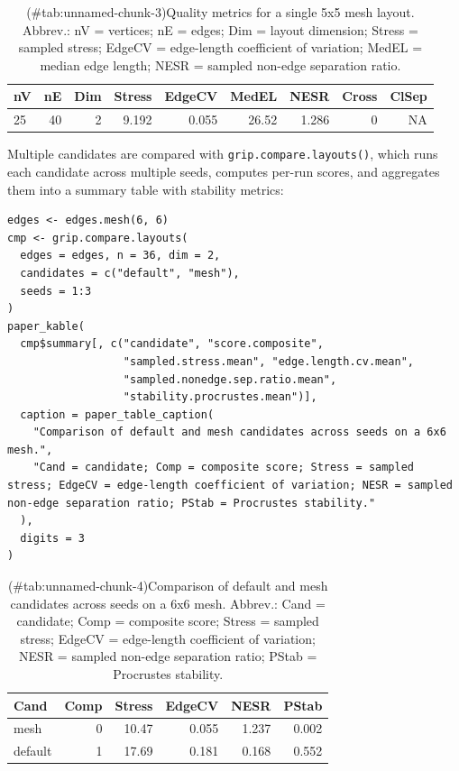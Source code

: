 \begin{table}

\caption{(\#tab:unnamed-chunk-3)Quality metrics for a single 5x5 mesh layout. Abbrev.: nV = vertices; nE = edges; Dim = layout dimension; Stress = sampled stress; EdgeCV = edge-length coefficient of variation; MedEL = median edge length; NESR = sampled non-edge separation ratio.}
\centering
\begin{tabular}[t]{l|r|r|r|r|r|r|r|r}
\hline
nV & nE & Dim & Stress & EdgeCV & MedEL & NESR & Cross & ClSep\\
\hline
25 & 40 & 2 & 9.192 & 0.055 & 26.52 & 1.286 & 0 & NA\\
\hline
\end{tabular}
\end{table}

Multiple candidates are compared with \texttt{grip.compare.layouts()}, which runs
each candidate across multiple seeds, computes per-run scores, and aggregates
them into a summary table with stability metrics:

\begin{verbatim}
edges <- edges.mesh(6, 6)
cmp <- grip.compare.layouts(
  edges = edges, n = 36, dim = 2,
  candidates = c("default", "mesh"),
  seeds = 1:3
)
paper_kable(
  cmp$summary[, c("candidate", "score.composite",
                  "sampled.stress.mean", "edge.length.cv.mean",
                  "sampled.nonedge.sep.ratio.mean",
                  "stability.procrustes.mean")],
  caption = paper_table_caption(
    "Comparison of default and mesh candidates across seeds on a 6x6 mesh.",
    "Cand = candidate; Comp = composite score; Stress = sampled stress; EdgeCV = edge-length coefficient of variation; NESR = sampled non-edge separation ratio; PStab = Procrustes stability."
  ),
  digits = 3
)
\end{verbatim}

\begin{table}

\caption{(\#tab:unnamed-chunk-4)Comparison of default and mesh candidates across seeds on a 6x6 mesh. Abbrev.: Cand = candidate; Comp = composite score; Stress = sampled stress; EdgeCV = edge-length coefficient of variation; NESR = sampled non-edge separation ratio; PStab = Procrustes stability.}
\centering
\begin{tabular}[t]{l|r|r|r|r|r}
\hline
Cand & Comp & Stress & EdgeCV & NESR & PStab\\
\hline
mesh & 0 & 10.47 & 0.055 & 1.237 & 0.002\\
\hline
default & 1 & 17.69 & 0.181 & 0.168 & 0.552\\
\hline
\end{tabular}
\end{table}

